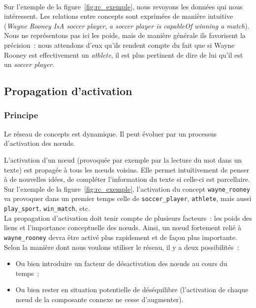\documentclass[a4paper, 12pt]{article}
\begin{document}
\paragraph{}
Sur l'exemple de la figure~\ref{fig:rc_exemple}, nous revoyons les données qui nous intéressent. Les relations entre concepts sont exprimées de manière intuitive (\textit{Wayne Rooney IsA soccer player}, \textit{a soccer player is capableOf winning a match}). Nous ne représentons pas ici les poids, mais de manière générale ils favorisent la précision~: nous attendons d'eux qu'ils rendent compte du fait que si Wayne Rooney est effectivement un \textit{athlete}, il est plus pertinent de dire de lui qu'il est un \textit{soccer player}.


\subsection{Propagation d'activation}

\subsubsection{Principe}
Le réseau de concepts est dynamique. Il peut évoluer par un processus d'activation des n\oe{}uds. 

L'activation d'un n\oe{}ud (provoquée par exemple par la lecture du mot dans un texte) est propagée à tous les n\oe{}uds voisins. Elle permet intuitivement de penser à de nouvelles idées, de compléter l'information du texte si celle-ci est parcellaire.\\

Sur l'exemple de la figure~\ref{fig:rc_exemple}, l'activation du concept \verb|wayne_rooney| va provoquer dans un premier temps celle de \verb|soccer_player|, \verb|athlete|, mais aussi \verb|play_sport|, \verb|win_match|, etc.\\

La propagation d'activation doit tenir compte de plusieurs facteurs~: les poids des liens et l'importance conceptuelle des n\oe{}uds. Ainsi, un n\oe{}ud fortement relié à \verb|wayne_rooney| devra être activé plus rapidement et de façon plus importante.\\

Selon la manière dont nous voulons utiliser le réseau, il y a deux possibilités~:
\begin{itemize}
  \item Ou bien introduire un facteur de désactivation des n\oe{}uds au cours du temps~;%
 \item Ou bien rester en situation potentielle de déséquilibre (l'activation de chaque n\oe{}ud de la composante connexe ne cesse d'augmenter).
\end{itemize}
\end{document}
